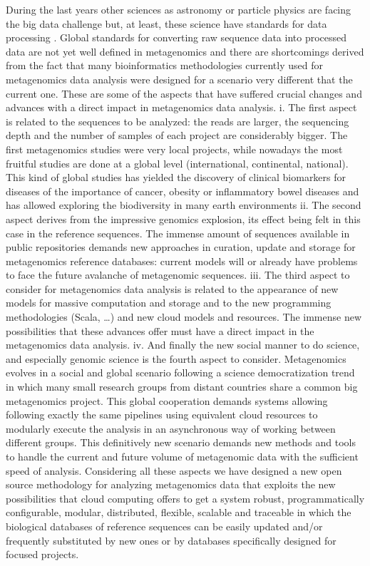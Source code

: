 \documentclass{frontiersSCNS} %
\begin{document}
During the last years other sciences as astronomy or particle physics
are facing the big data challenge but, at least, these science have
standards for data processing \citep{stephens2015big}. Global standards
for converting raw sequence data into processed data are not yet well
defined in metagenomics and there are shortcomings derived from the fact
that many bioinformatics methodologies currently used for metagenomics
data analysis were designed for a scenario very different that the
current one. These are some of the aspects that have suffered crucial
changes and advances with a direct impact in metagenomics data analysis.
i. The first aspect is related to the sequences to be analyzed: the
reads are larger, the sequencing depth and the number of samples of each
project are considerably bigger. The first metagenomics studies were
very local projects, while nowadays the most fruitful studies are done
at a global level (international, continental, national). This kind of
global studies has yielded the discovery of clinical biomarkers for
diseases of the importance of cancer, obesity or inflammatory bowel
diseases and has allowed exploring the biodiversity in many earth
environments ii. The second aspect derives from the impressive genomics
explosion, its effect being felt in this case in the reference
sequences. The immense amount of sequences available in public
repositories demands new approaches in curation, update and storage for
metagenomics reference databases: current models will or already have
problems to face the future avalanche of metagenomic sequences. iii. The
third aspect to consider for metagenomics data analysis is related to
the appearance of new models for massive computation and storage and to
the new programming methodologies (Scala, \ldots{}) and new cloud models
and resources. The immense new possibilities that these advances offer
must have a direct impact in the metagenomics data analysis. iv. And
finally the new social manner to do science, and especially genomic
science is the fourth aspect to consider. Metagenomics evolves in a
social and global scenario following a science democratization trend in
which many small research groups from distant countries share a common
big metagenomics project. This global cooperation demands systems
allowing following exactly the same pipelines using equivalent cloud
resources to modularly execute the analysis in an asynchronous way of
working between different groups. This definitively new scenario demands
new methods and tools to handle the current and future volume of
metagenomic data with the sufficient speed of analysis. Considering all
these aspects we have designed a new open source methodology for
analyzing metagenomics data that exploits the new possibilities that
cloud computing offers to get a system robust, programmatically
configurable, modular, distributed, flexible, scalable and traceable in
which the biological databases of reference sequences can be easily
updated and/or frequently substituted by new ones or by databases
specifically designed for focused projects.
\end{document}

